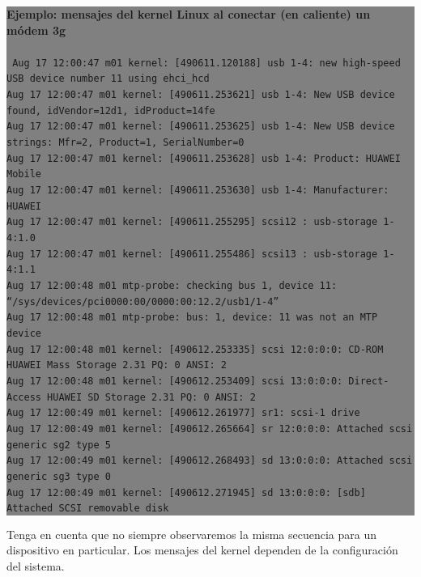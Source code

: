 \documentclass[12pt]{article}
\begin{document}
\colorbox{grey}{\parbox[t]{0.95\linewidth}{ \vspace*{0.5cm} { 
{\bf Ejemplo: mensajes del kernel Linux al conectar (en caliente) un módem 3g\\ }
\\ {\tt \scriptsize
Aug 17 12:00:47 m01 kernel: [490611.120188] usb 1-4: new high-speed USB device number 11 using ehci\_hcd\\
Aug 17 12:00:47 m01 kernel: [490611.253621] usb 1-4: New USB device found, idVendor=12d1, idProduct=14fe\\
Aug 17 12:00:47 m01 kernel: [490611.253625] usb 1-4: New USB device strings: Mfr=2, Product=1, SerialNumber=0\\
Aug 17 12:00:47 m01 kernel: [490611.253628] usb 1-4: Product: HUAWEI Mobile\\
Aug 17 12:00:47 m01 kernel: [490611.253630] usb 1-4: Manufacturer: HUAWEI\\
Aug 17 12:00:47 m01 kernel: [490611.255295] scsi12 : usb-storage 1-4:1.0\\
Aug 17 12:00:47 m01 kernel: [490611.255486] scsi13 : usb-storage 1-4:1.1\\
Aug 17 12:00:48 m01 mtp-probe: checking bus 1, device 11: ``/sys/devices/pci0000:00/0000:00:12.2/usb1/1-4''\\
Aug 17 12:00:48 m01 mtp-probe: bus: 1, device: 11 was not an MTP device\\
Aug 17 12:00:48 m01 kernel: [490612.253335] scsi 12:0:0:0: CD-ROM            HUAWEI   Mass Storage     2.31 PQ: 0 ANSI: 2\\
Aug 17 12:00:48 m01 kernel: [490612.253409] scsi 13:0:0:0: Direct-Access     HUAWEI   SD Storage       2.31 PQ: 0 ANSI: 2\\
Aug 17 12:00:49 m01 kernel: [490612.261977] sr1: scsi-1 drive\\
Aug 17 12:00:49 m01 kernel: [490612.265664] sr 12:0:0:0: Attached scsi generic sg2 type 5\\
Aug 17 12:00:49 m01 kernel: [490612.268493] sd 13:0:0:0: Attached scsi generic sg3 type 0\\
Aug 17 12:00:49 m01 kernel: [490612.271945] sd 13:0:0:0: [sdb] Attached SCSI removable disk\\
}
} \vspace*{0.5cm} } } 

Tenga en cuenta que no siempre observaremos la misma secuencia para un dispositivo en particular. 
Los mensajes del kernel dependen de la configuración del sistema.
\end{document}
